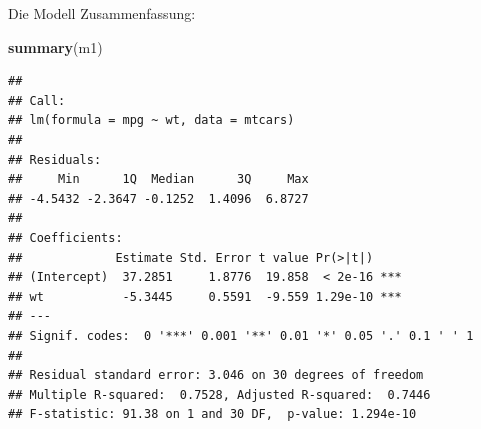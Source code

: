 \documentclass[ignorenonframetext,]{beamer}
\newenvironment{Shaded}{\begin{snugshade}}{\end{snugshade}}
\newcommand{\KeywordTok}[1]{\textcolor[rgb]{0.13,0.29,0.53}{\textbf{#1}}}
\newcommand{\NormalTok}[1]{#1}
\begin{document}
\begin{frame}[fragile]{Die Modell Zusammenfassung:}

\begin{Shaded}
\begin{Highlighting}[]
\KeywordTok{summary}\NormalTok{(m1) }
\end{Highlighting}
\end{Shaded}

\begin{verbatim}
## 
## Call:
## lm(formula = mpg ~ wt, data = mtcars)
## 
## Residuals:
##     Min      1Q  Median      3Q     Max 
## -4.5432 -2.3647 -0.1252  1.4096  6.8727 
## 
## Coefficients:
##             Estimate Std. Error t value Pr(>|t|)    
## (Intercept)  37.2851     1.8776  19.858  < 2e-16 ***
## wt           -5.3445     0.5591  -9.559 1.29e-10 ***
## ---
## Signif. codes:  0 '***' 0.001 '**' 0.01 '*' 0.05 '.' 0.1 ' ' 1
## 
## Residual standard error: 3.046 on 30 degrees of freedom
## Multiple R-squared:  0.7528, Adjusted R-squared:  0.7446 
## F-statistic: 91.38 on 1 and 30 DF,  p-value: 1.294e-10
\end{verbatim}

\end{frame}
\end{document}
